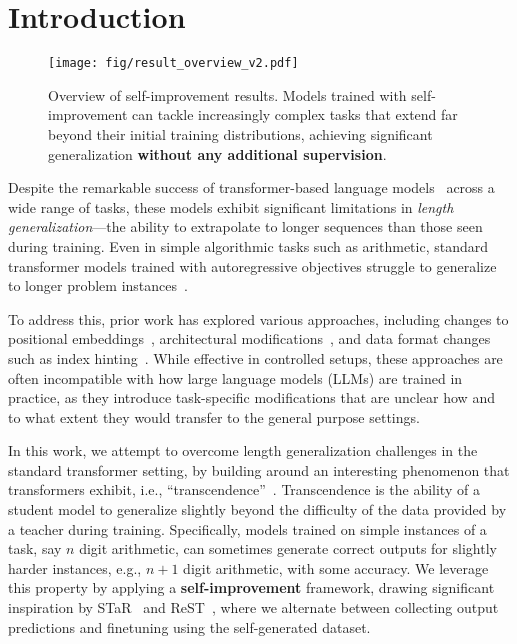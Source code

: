 \section{Introduction}\label{sec:intro}












\begin{figure*}
    \centering
    \texttt{[image: fig/result\_overview\_v2.pdf]}
    \caption{Overview of self-improvement results. Models trained with self-improvement can tackle increasingly complex tasks that extend far beyond their initial training distributions, achieving significant generalization \textbf{without any additional supervision}.}
    \label{fig:result_overview}
    \vspace{-6mm}
\end{figure*}


Despite the remarkable success of transformer-based language models~\citep{vaswani2017attention} across a wide range of tasks, these models exhibit significant limitations in \textit{length generalization}—the ability to extrapolate to longer sequences than those seen during training. Even in simple algorithmic tasks such as arithmetic, standard transformer models trained with autoregressive objectives struggle to generalize to longer problem instances~\citep{dubois2019location,hupkes2020compositionality,newman2020eos,anil2022exploring}. 

To address this, prior work has explored various approaches, including changes to positional embeddings~\citep{ruoss2023randomized,li2023functional,mcleish2024transformers,kazemnejad2024impact,sabbaghi2024explicitly,Cho2024PositionCI,zhou2024transformers}, architectural modifications~\citep{fan2024looped,duan2023interpolation}, and data format changes such as index hinting~\citep{zhou2023algorithms,zhou2024transformers}. While effective in controlled setups, these approaches are often incompatible with how large language models (LLMs) are trained in practice, as they introduce task-specific modifications that are unclear how and to what extent they would transfer to the general purpose settings.

In this work, we attempt to overcome length generalization challenges in the standard transformer setting, by building around an interesting phenomenon that transformers exhibit, i.e., ``transcendence''~\citep{zhang2024transcendence}. Transcendence is the ability of a student model to  generalize slightly beyond the difficulty of the data provided by a teacher during training. Specifically, models trained on simple instances of a task, say $n$ digit arithmetic, can sometimes generate correct outputs for slightly harder instances, e.g., $n+1$ digit arithmetic, with some accuracy. We leverage this property by applying a \textbf{self-improvement} framework, drawing significant inspiration by STaR~\citep{zelikman2022star} and ReST~\citep{gulcehre2023reinforced}, where we alternate between collecting output predictions and finetuning using the self-generated dataset. 

